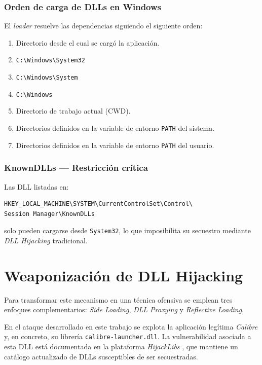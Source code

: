 \subsubsection{Orden de carga de DLLs en Windows}

El \textit{loader} resuelve las dependencias siguiendo el siguiente orden:

\begin{enumerate}
    \item Directorio desde el cual se cargó la aplicación.
    \item \texttt{C:\textbackslash Windows\textbackslash System32}
    \item \texttt{C:\textbackslash Windows\textbackslash System}
    \item \texttt{C:\textbackslash Windows}
    \item Directorio de trabajo actual (CWD).
    \item Directorios definidos en la variable de entorno \texttt{PATH} del sistema.
    \item Directorios definidos en la variable de entorno \texttt{PATH} del usuario.
\end{enumerate}

\subsubsection{KnownDLLs — Restricción crítica}

Las DLL listadas en:

\begin{verbatim}
HKEY_LOCAL_MACHINE\SYSTEM\CurrentControlSet\Control\
Session Manager\KnownDLLs
\end{verbatim}

solo pueden cargarse desde \texttt{System32}, lo que imposibilita su secuestro mediante \textit{DLL Hijacking} tradicional.

\section{Weaponización de DLL Hijacking}
\label{sec:dll-hijacking}

Para transformar este mecanismo en una técnica ofensiva se emplean tres enfoques complementarios: \textit{Side Loading}, \textit{DLL Proxying} y \textit{Reflective Loading}.

En el ataque desarrollado en este trabajo se explota la aplicación legítima \textit{Calibre} y, en concreto, su librería \texttt{calibre-launcher.dll}. La vulnerabilidad asociada a esta DLL está documentada en la plataforma \textit{HijackLibs} \cite{hijacklibs-calibre-launcher}, que mantiene un catálogo actualizado de DLLs susceptibles de ser secuestradas.

